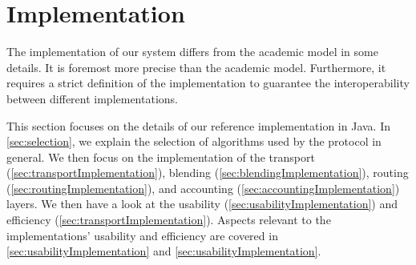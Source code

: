 
\part{Implementation}\label{sec:implementation}
The implementation of our system differs from the academic model in some details. It is foremost more precise than the academic model. Furthermore, it requires a strict definition of the implementation to guarantee the interoperability between different implementations.

This section focuses on the details of our reference implementation in Java. In \cref{sec:selection}, we explain the selection of algorithms used by the protocol in general. We then focus on the implementation of the transport (\cref{sec:transportImplementation}), blending (\cref{sec:blendingImplementation}), routing (\cref{sec:routingImplementation}), and accounting (\cref{sec:accountingImplementation}) layers. We then have a look at the usability (\cref{sec:usabilityImplementation}) and efficiency (\cref{sec:transportImplementation}). Aspects relevant to the implementations' usability and efficiency are covered in \cref{sec:usabilityImplementation} and \cref{sec:usabilityImplementation}.

